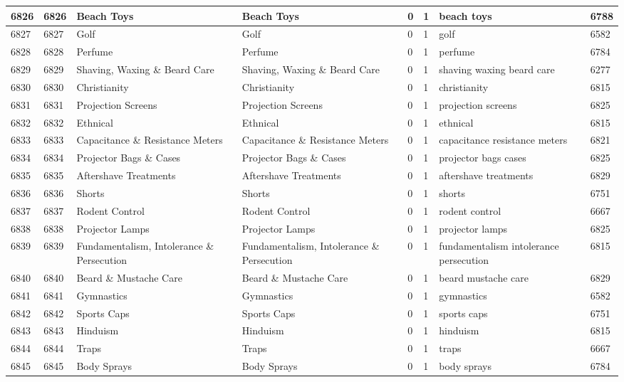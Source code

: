 \begin{longtable}{|l|l|l|l|l|l|l|l|}
6826 & 6826 & Beach Toys & Beach Toys & 0 & 1 & beach toys & 6788 \\ \hline 
6827 & 6827 & Golf & Golf & 0 & 1 & golf & 6582 \\ \hline 
6828 & 6828 & Perfume & Perfume & 0 & 1 & perfume & 6784 \\ \hline 
6829 & 6829 & Shaving, Waxing \& Beard Care & Shaving, Waxing \& Beard Care & 0 & 1 & shaving waxing beard care & 6277 \\ \hline 
6830 & 6830 & Christianity & Christianity & 0 & 1 & christianity & 6815 \\ \hline 
6831 & 6831 & Projection Screens & Projection Screens & 0 & 1 & projection screens & 6825 \\ \hline 
6832 & 6832 & Ethnical & Ethnical & 0 & 1 & ethnical & 6815 \\ \hline 
6833 & 6833 & Capacitance \& Resistance Meters & Capacitance \& Resistance Meters & 0 & 1 & capacitance resistance meters & 6821 \\ \hline 
6834 & 6834 & Projector Bags \& Cases & Projector Bags \& Cases & 0 & 1 & projector bags cases & 6825 \\ \hline 
6835 & 6835 & Aftershave Treatments & Aftershave Treatments & 0 & 1 & aftershave treatments & 6829 \\ \hline 
6836 & 6836 & Shorts & Shorts & 0 & 1 & shorts & 6751 \\ \hline 
6837 & 6837 & Rodent Control & Rodent Control & 0 & 1 & rodent control & 6667 \\ \hline 
6838 & 6838 & Projector Lamps & Projector Lamps & 0 & 1 & projector lamps & 6825 \\ \hline 
6839 & 6839 & Fundamentalism, Intolerance \& Persecution & Fundamentalism, Intolerance \& Persecution & 0 & 1 & fundamentalism intolerance persecution & 6815 \\ \hline 
6840 & 6840 & Beard \& Mustache Care & Beard \& Mustache Care & 0 & 1 & beard mustache care & 6829 \\ \hline 
6841 & 6841 & Gymnastics & Gymnastics & 0 & 1 & gymnastics & 6582 \\ \hline 
6842 & 6842 & Sports Caps & Sports Caps & 0 & 1 & sports caps & 6751 \\ \hline 
6843 & 6843 & Hinduism & Hinduism & 0 & 1 & hinduism & 6815 \\ \hline 
6844 & 6844 & Traps & Traps & 0 & 1 & traps & 6667 \\ \hline 
6845 & 6845 & Body Sprays & Body Sprays & 0 & 1 & body sprays & 6784 \\ \hline 

\end{longtable}

